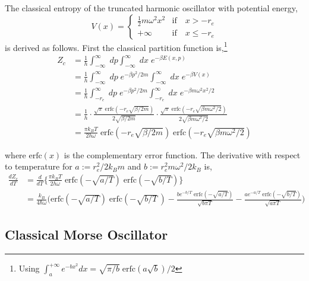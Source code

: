 \documentclass[../main.tex]{subfiles}
\begin{document}
The classical entropy of the truncated harmonic oscillator with potential energy, 
\begin{equation}
	V(x) = \begin{cases}
		\frac{1}{2}m\omega^2x^2 &\text{if} \quad x > -r_e \\
		+\infty &\text{if} \quad x \le -r_e
	\end{cases} 
\end{equation}
is derived as follows. First the classical partition function is,\footnote{Using $\int_{a}^{+\infty}  e^{-bx^2} dx = \sqrt{\pi/b}\;\text{erfc}(a\sqrt{b})/2$}
\begin{equation}
	\begin{aligned}
		Z_c &= \frac{1}{h}\int_{-\infty}^\infty \; dp\int_{-\infty}^{\infty} \; dx \; e^{-\beta E(x,p)} \\
		&= \frac{1}{h}\int_{-\infty}^\infty \; dp \; e^{-\beta p^2/2m} \int_{-\infty}^{\infty} \; dx \; e^{-\beta V(x)} \\
		&= \frac{1}{h}\int_{-r_e}^\infty \; dp \; e^{-\beta p^2/2m} \int_{-r_e}^{\infty} \; dx \; e^{-\beta m\omega^2x^2/2} \\
		&=\frac{1}{h}\cdot \frac{\sqrt{\pi}\;\text{erfc}(-r_e \sqrt{\beta/2m})}{2\sqrt{\beta/2m}}\cdot \frac{\sqrt{\pi}\;\text{erfc}(-r_e \sqrt{\beta m\omega^2/2})}{2\sqrt{\beta m\omega^2/2}} \\
		&=\frac{\pi k_B T}{2h\omega} \;\text{erfc}(-r_e \sqrt{\beta/2m})\;\text{erfc}(-r_e \sqrt{\beta m\omega^2/2})
	\end{aligned}
\end{equation}

where $\text{erfc}(x)$ is the complementary error function. The derivative with respect to temperature for $a := r_e^2/ 2k_B m$ and $b := r_e^2m\omega^2/2k_B$ is, 
\begin{equation}
	\begin{aligned}
		\frac{d Z_c}{dT} &= \frac{d}{dT} {\Big \{} \frac{\pi k_B T}{2h\omega} \;\text{erfc}(- \sqrt{a/T})\;\text{erfc}(- \sqrt{b/T}) {\Big \}} \\
		&= \frac{ k_B}{4\hbar\omega} {\Bigg (} \text{erfc}(- \sqrt{a/T})\;\text{erfc}(- \sqrt{b/T}\,) - \frac{b e^{-b/T} \; \text{erfc}(-\sqrt{a/T})}{\sqrt{b\pi T}} - \frac{a e^{-a/T} \; \text{erfc}(-\sqrt{b/T})}{\sqrt{a\pi T}} {\Bigg )}
	\end{aligned}
\end{equation}

\subsection{Classical Morse Oscillator}
\end{document}
